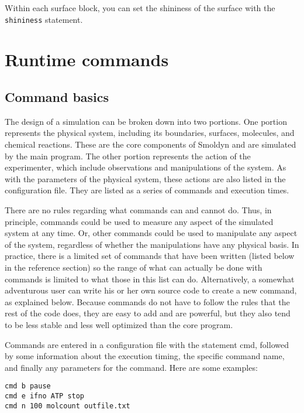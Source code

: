 \documentclass {scrbook}
\newcommand {\ttt} {\texttt}
\begin{document}
Within each surface block, you can set the shininess of the surface with the \ttt{shininess} statement.


\chapter{Runtime commands}

\section{Command basics}

The design of a simulation can be broken down into two portions. One portion represents the physical system, including its boundaries, surfaces, molecules, and chemical reactions. These are the core components of Smoldyn and are simulated by the main program. The other portion represents the action of the experimenter, which include observations and manipulations of the system. As with the parameters of the physical system, these actions are also listed in the configuration file. They are listed as a series of commands and execution times.

There are no rules regarding what commands can and cannot do. Thus, in principle, commands could be used to measure any aspect of the simulated system at any time. Or, other commands could be used to manipulate any aspect of the system, regardless of whether the manipulations have any physical basis. In practice, there is a limited set of commands that have been written (listed below in the reference section) so the range of what can actually be done with commands is limited to what those in this list can do. Alternatively, a somewhat adventurous user can write his or her own source code to create a new command, as explained below. Because commands do not have to follow the rules that the rest of the code does, they are easy to add and are powerful, but they also tend to be less stable and less well optimized than the core program.

Commands are entered in a configuration file with the statement cmd, followed by some information about the execution timing, the specific command name, and finally any parameters for the command. Here are some examples:

\begin{lstlisting}[style=SSAC]
cmd b pause
cmd e ifno ATP stop
cmd n 100 molcount outfile.txt
\end{lstlisting}
\end{document}
